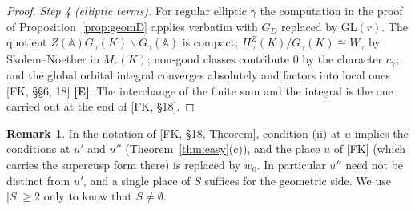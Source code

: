 \documentclass[12pt]{article}
\newcommand{\A}{\mathbb{A}}
\newcommand{\GL}{\mathrm{GL}}
\newcommand{\Ev}{\textbf{[E]}}
\theoremstyle{plain}
\theoremstyle{definition}
\newtheorem{remark}[theorem]{Remark}
\begin{document}
\begin{proof}
\emph{Step 4 (elliptic terms).} For regular elliptic $\gamma$ the computation in the proof of Proposition~\ref{prop:geomD} applies verbatim with $G_D$ replaced by $\GL(r)$. The quotient $Z(\A)G_\gamma(K)\backslash G_\gamma(\A)$ is compact; $H^Z_\gamma(K)/G_\gamma(K)\cong W_\gamma$ by Skolem--Noether in $M_r(K)$; non-good classes contribute $0$ by the character $c_\gamma$; and the global orbital integral converges absolutely and factors into local ones [FK, \S\S6, 18] \Ev. The interchange of the finite sum and the integral is the one carried out at the end of [FK, \S18].
\end{proof}

\begin{remark}
In the notation of [FK, \S18, Theorem], condition (ii) at $u$ implies the conditions at $u'$ and $u''$ (Theorem~\ref{thm:easy}(c)), and the place $u$ of [FK] (which carries the supercusp form there) is replaced by $w_0$. In particular $u''$ need not be distinct from $u'$, and a single place of $S$ suffices for the geometric side. We use $|S|\ge2$ only to know that $S\neq\emptyset$.
\end{remark}
\end{document}
